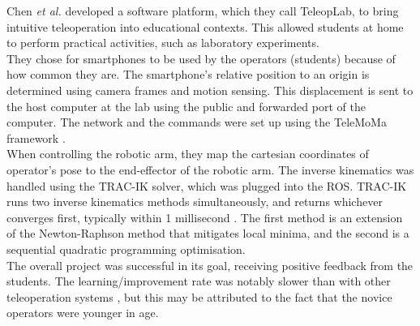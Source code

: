 Chen \textit{et al.} \cite{bib:teleoperation_TeleopLab} developed a software platform, which they call TeleopLab, to bring intuitive teleoperation into educational contexts. This allowed students at home to perform practical activities, such as laboratory experiments.\\
They chose for smartphones to be used by the operators (students) because of how common they are. The smartphone's relative position to an origin is determined using camera frames and motion sensing. This displacement is sent to the host computer at the lab using the public and forwarded port of the computer. The network and the commands were set up using the TeleMoMa framework \cite{bib:teleoperation_TeleMoMa}.\\
When controlling the robotic arm, they map the cartesian coordinates of operator's pose to the end-effector of the robotic arm. The inverse kinematics was handled using the TRAC-IK solver, which was plugged into the ROS. TRAC-IK runs two inverse kinematics methods simultaneously, and returns whichever converges first, typically within 1 millisecond \cite{bib:TRAC-IK}. The first method is an extension of the Newton-Raphson method that mitigates local minima, and the second is a sequential quadratic programming optimisation.\\
The overall project was successful in its goal, receiving positive feedback from the students. The learning/improvement rate was notably slower than with other teleoperation systems \cite{bib:teleoperation_surgery}\cite{bib:teleoperation_continuous_space}\cite{bib:teleoperation_continuous_space_2}, but this may be attributed to the fact that the novice operators were younger in age.



